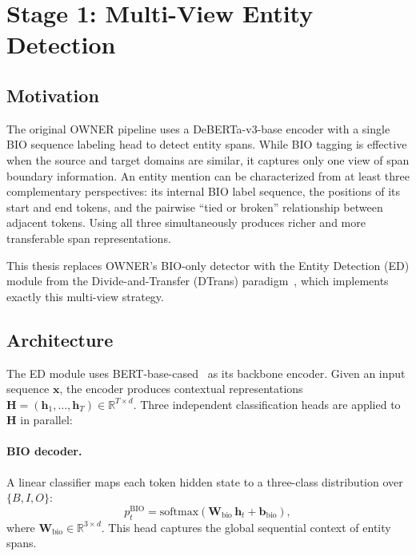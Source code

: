\documentclass[14pt]{extreport}
\begin{document}
\FloatBarrier

\section{Stage 1: Multi-View Entity Detection}

\subsection{Motivation}

The original OWNER pipeline uses a DeBERTa-v3-base encoder with a single BIO sequence labeling head to detect entity spans. While BIO tagging is effective when the source and target domains are similar, it captures only one view of span boundary information. An entity mention can be characterized from at least three complementary perspectives: its internal BIO label sequence, the positions of its start and end tokens, and the pairwise ``tied or broken'' relationship between adjacent tokens. Using all three simultaneously produces richer and more transferable span representations.

This thesis replaces OWNER's BIO-only detector with the Entity Detection (ED) module from the Divide-and-Transfer (DTrans) paradigm~\cite{zhang-etal-2024-dtrans}, which implements exactly this multi-view strategy.

\subsection{Architecture}

The ED module uses BERT-base-cased~\cite{devlin-etal-2019-bert} as its backbone encoder. Given an input sequence $\mathbf{x}$, the encoder produces contextual representations $\mathbf{H} = (\mathbf{h}_1, \ldots, \mathbf{h}_T) \in \mathbb{R}^{T \times d}$. Three independent classification heads are applied to $\mathbf{H}$ in parallel:

\paragraph{BIO decoder.}
A linear classifier maps each token hidden state to a three-class distribution over $\{B, I, O\}$:
\begin{equation}
    p^{\text{BIO}}_t = \text{softmax}(\mathbf{W}_{\text{bio}}\,\mathbf{h}_t + \mathbf{b}_{\text{bio}}),
    \label{eq:bio}
\end{equation}
where $\mathbf{W}_{\text{bio}} \in \mathbb{R}^{3 \times d}$. This head captures the global sequential context of entity spans.
\end{document}
